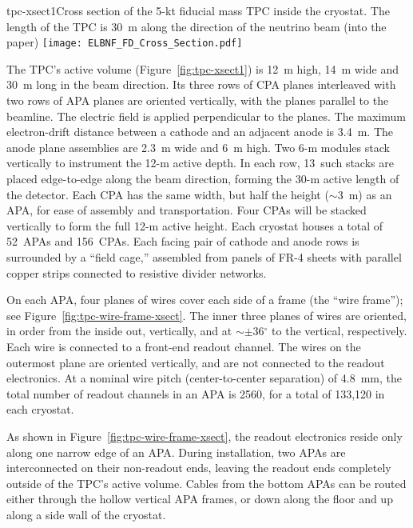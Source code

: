 \begin{cdrfigure}{tpc-xsect1}{Cross section of the 5-kt fiducial mass TPC inside the cryostat.  The length of the TPC is  30~m along the direction of the neutrino beam (into the paper)}
\texttt{[image: ELBNF\_FD\_Cross\_Section.pdf]}
\end{cdrfigure}


The TPC's active volume (Figure~\ref{fig:tpc-xsect1}) is 12~m high, 14~m wide and 30~m long in the beam direction. 
Its three rows of CPA planes interleaved with two rows of APA planes 
are oriented vertically, with the planes parallel to the beamline. The  
electric field is applied perpendicular to the planes.
The maximum electron-drift distance between a cathode and an adjacent 
anode is 3.4~m. The anode plane assemblies are 
2.3~m wide and 6~m high. Two 6-m modules stack vertically to 
instrument the 12-m active depth. In each row, 13~such stacks are placed 
edge-to-edge 
along the beam direction, forming the 30-m active length of the detector.  Each CPA has the same width, but half the height ($\sim$3~m) as an APA, for ease of assembly and transportation.  Four CPAs will be stacked vertically to form the full 12-m active height. 
Each cryostat houses a total of 52~APAs and 156~CPAs.
Each facing pair of cathode and anode rows is surrounded by a 
``field cage,'' assembled from panels of FR-4 sheets with parallel copper strips connected to resistive divider networks. 

On each APA, four planes of wires cover each side of a frame (the ``wire frame''); see Figure~\ref{fig:tpc-wire-frame-xsect}.
The inner three planes of wires are oriented, in order from the inside out, vertically, and at $\sim\pm$36$^\circ$ 
to the vertical, respectively.
 Each wire is connected to a front-end readout channel.
The wires on the outermost plane are oriented vertically, and are not connected to the readout electronics.
At a nominal wire pitch (center-to-center separation) of 4.8~mm,
the total number of readout channels in an APA is 2560, for a total of 133,120 in each cryostat.
 
As shown in Figure~\ref{fig:tpc-wire-frame-xsect}, the readout electronics reside only along one narrow edge of an APA. 
During installation, two APAs are interconnected on their non-readout ends, leaving the readout ends completely outside of the TPC's active volume.  Cables from the bottom APAs can be routed either through the hollow vertical APA frames, or down along the floor and up along a side wall of the cryostat.

